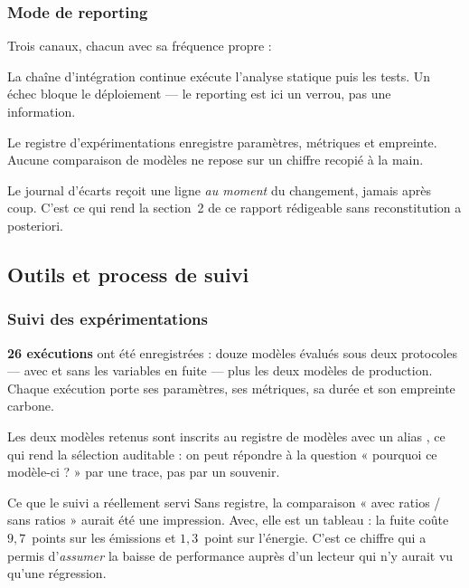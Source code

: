 \subsubsection*{Mode de reporting}

Trois canaux, chacun avec sa fréquence propre :

\begin{description}[leftmargin=0em,style=nextline,itemsep=0.3em]
  \item[À chaque \emph{commit}] La chaîne d'intégration continue exécute l'analyse
        statique puis les tests. Un échec bloque le déploiement — le reporting
        est ici un verrou, pas une information.
  \item[À chaque campagne de modélisation] Le registre d'expérimentations
        enregistre paramètres, métriques et empreinte. Aucune comparaison de
        modèles ne repose sur un chiffre recopié à la main.
  \item[Au fil de l'eau] Le journal d'écarts reçoit une ligne \emph{au moment} du
        changement, jamais après coup. C'est ce qui rend la section~2 de ce
        rapport rédigeable sans reconstitution a posteriori.
\end{description}

\subsection{Outils et process de suivi}

\subsubsection*{Suivi des expérimentations}

\textbf{26 exécutions} ont été enregistrées : douze modèles évalués sous deux
protocoles — avec et sans les variables en fuite — plus les deux modèles de
production. Chaque exécution porte ses paramètres, ses métriques, sa durée et son
empreinte carbone.

Les deux modèles retenus sont inscrits au registre de modèles avec un alias
, ce qui rend la sélection auditable : on peut répondre à la
question « pourquoi ce modèle-ci ? » par une trace, pas par un souvenir.

\begin{constat}{Ce que le suivi a réellement servi}
Sans registre, la comparaison « avec ratios / sans ratios » aurait été une
impression. Avec, elle est un tableau : la fuite coûte $9{,}7$~points sur les
émissions et $1{,}3$~point sur l'énergie. C'est ce chiffre qui a permis
d'\emph{assumer} la baisse de performance auprès d'un lecteur qui n'y aurait vu
qu'une régression.
\end{constat}



